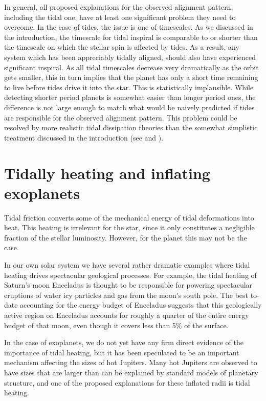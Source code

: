 In general, all proposed explanations for the observed alignment pattern,
including the tidal one, have at least one significant problem they need to
overcome. In the case of tides, the issue is one of timescales. As we discussed
in the introduction, the timescale for tidal inspiral is comparable to or
shorter than the timescale on which the stellar spin is affected by tides. As a
result, any system which has been appreciably tidally aligned, should also have
experienced significant inspiral. As all tidal timescales decrease very
dramatically as the orbit gets smaller, this in turn implies that the planet has
only a short time remaining to live before tides drive it into the star. This is
statistically implausible. While detecting shorter period planets is somewhat
easier than longer period ones, the difference is not large enough to match what
would be naively predicted if tides are responsible for the observed alignment
pattern. This problem could be resolved by more realistic tidal dissipation
theories than the somewhat simplistic treatment discussed in the introduction
(see \citep{Lai_12} and \citep{Anderson_et_al_21}).

\section{Tidally heating and inflating exoplanets}

Tidal friction converts some of the mechanical energy of tidal deformations into
heat. This heating is irrelevant for the star, since it only constitutes a
negligible fraction of the stellar luminosity. However, for the planet this may
not be the case.

In our own solar system we have several rather dramatic examples where
tidal heating drives spectacular geological processes. For example, the tidal
heating of Saturn's moon Enceladus is thought to be responsible for powering
spectacular eruptions of water icy particles and gas from the moon's south pole.
The best to-date accounting for the energy budget of Enceladus suggests that
this geologically active region on Enceladus accounts for roughly a quarter of
the entire energy budget of that moon, even though it covers less than 5\% of
the surface.

In the case of exoplanets, we do not yet have any firm direct evidence of the
importance of tidal heating, but it has been speculated to be an important
mechanism affecting the sizes of hot Jupiters. Many hot Jupiters are observed to
have sizes that are larger than can be explained by standard models of planetary
structure, and one of the proposed explanations for these inflated radii is
tidal heating.

